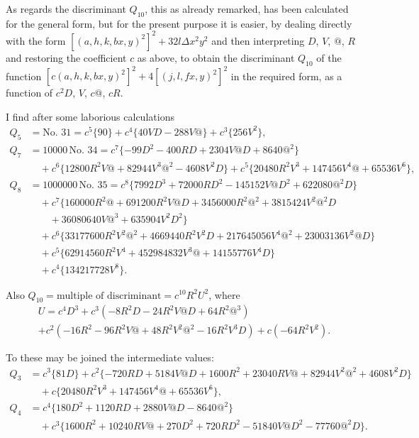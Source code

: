 \documentclass[11pt,a4paper]{article}
\theoremstyle{definition}
\begin{document}
\newpage

As regards the discriminant $Q_{10}$, this as already remarked, has been calculated for the general form, but for the present purpose it is easier, by dealing directly with the form $[(a,h,k,b x,y)^2]^2 + 32l\Delta x^2y^2$ and then interpreting $D$, $V$, $\text{@}$, $R$ and restoring the coefficient $c$ as above, to obtain the discriminant $Q_{10}$ of the function $[c(a,h,k,b x,y)^2]^2 + 4[(j,l,f x,y)^2]^2$ in the required form, as a function of $c^2D$, $V$, $c\text{@}$, $cR$.

I find after some laborious calculations
\begin{align*}
Q_5 &= \text{No.\ 31} = c^5\{90\} + c^4\{40VD - 288V\text{@}\} + c^3\{256V^2\},\\
Q_7 &= 10000\,\text{No.\ 34} = c^7\{-99D^2 - 400RD + 2304V\text{@}D + 8640\text{@}^2\}\\
&\quad + c^6\{12800R^2V\text{@} + 82944V^3\text{@}^2 - 4608V^2D\} + c^5\{20480R^2V^3 + 147456V^4\text{@} + 65536V^6\},\\
Q_8 &= 1000000\,\text{No.\ 35} = c^8\{7992D^3 + 72000RD^2 - 145152V\text{@}D^2 + 622080\text{@}^2D\}\\
&\quad + c^7\{160000R^2\text{@} + 691200R^2V\text{@}D + 3456000R^2\text{@}^2 + 3815424V^2\text{@}^2D\\
&\quad\quad + 36080640V\text{@}^3 + 635904V^2D^2\}\\
&\quad + c^6\{33177600R^2V^2\text{@}^2 + 4669440R^2V^2D + 217645056V^4\text{@}^2 + 23003136V^2\text{@}D\}\\
&\quad + c^5\{62914560R^2V^4 + 452984832V^3\text{@} + 14155776V^4D\}\\
&\quad + c^4\{134217728V^8\}.
\end{align*}

Also $Q_{10} = \text{multiple of discriminant} = c^{10}R^2U^2$, where
\begin{multline*}
U = c^4D^3 + c^3(-8R^2D - 24R^2V\text{@}D + 64R^2\text{@}^3) \\
+ c^2(-16R^2 - 96R^2V\text{@} + 48R^2V^2\text{@}^2 - 16R^2V^3D) + c(-64R^2V^2).
\end{multline*}

To these may be joined the intermediate values:
\begin{align*}
Q_3 &= c^3\{81D\} + c^2\{-720RD + 5184V\text{@}D + 1600R^2 + 23040RV\text{@} + 82944V^2\text{@}^2 + 4608V^2D\}\\
&\quad + c\{20480R^2V^3 + 147456V^4\text{@} + 65536V^6\},\\
Q_4 &= c^4\{180D^2 + 1120RD + 2880V\text{@}D - 8640\text{@}^2\}\\
&\quad + c^3\{1600R^2 + 10240RV\text{@} + 270D^2 + 720RD^2 - 51840V\text{@}D^2 - 77760\text{@}^2D\}.
\end{align*}
\end{document}

